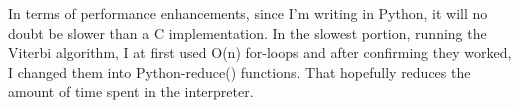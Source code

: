 \documentclass[a4paper, 12pt]{report}
\begin{document}
    In terms of performance enhancements, since I'm writing in Python,
        it will no doubt be slower than a C implementation.
    In the slowest portion, running the Viterbi algorithm,
        I at first used O(n) for-loops and after confirming they worked,
        I changed them into Python-reduce() functions.
    That hopefully reduces the amount of time spent in the interpreter.
\end{document}
